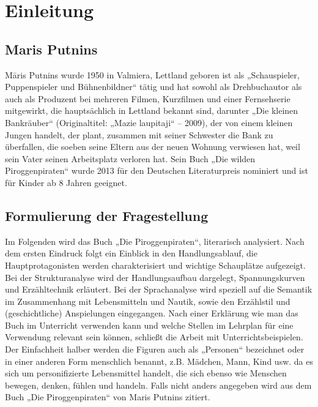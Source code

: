 \chapter{Einleitung}

\section{Maris Putnins}
Māris Putnins wurde 1950 in Valmiera, Lettland geboren ist als „Schauspieler, Puppenspieler und Bühnenbildner“ tätig \cite{pir} und hat sowohl als Drehbuchautor als auch als Produzent bei mehreren Filmen, Kurzfilmen und einer Fernsehserie mitgewirkt, die hauptsächlich in Lettland bekannt  sind, \cite{imdb} darunter „Die kleinen Bankräuber“ (Originaltitel: „Mazie laupitaji“ – 2009), der von einem kleinen Jungen handelt, der plant, zusammen  mit seiner Schwester die Bank zu überfallen, die soeben seine Eltern aus der neuen Wohnung verwiesen hat, weil sein Vater seinen Arbeitsplatz verloren hat. \cite{imdb2}
Sein Buch „Die wilden Piroggenpiraten“ wurde 2013 für den Deutschen Literaturpreis nominiert und ist für Kinder ab 8 Jahren geeignet. 

\section{Formulierung der Fragestellung}
Im Folgenden wird das Buch „Die Piroggenpiraten“, literarisch analysiert. Nach dem ersten Eindruck folgt ein Einblick in den Handlungsablauf, die Hauptprotagonisten werden charakterisiert und wichtige Schauplätze aufgezeigt. Bei der Strukturanalyse wird der Handlungsaufbau dargelegt, Spannungskurven und Erzähltechnik erläutert. Bei der Sprachanalyse wird speziell auf die Semantik im Zusammenhang mit Lebensmitteln und Nautik, sowie den Erzählstil und (geschichtliche) Anspielungen eingegangen. Nach einer Erklärung wie man das Buch im Unterricht verwenden kann und welche Stellen im Lehrplan für eine Verwendung relevant sein können, schließt die Arbeit mit Unterrichtsbeispielen. Der Einfachheit halber werden die Figuren auch als „Personen“ bezeichnet oder in einer anderen Form menschlich benannt, z.B. Mädchen, Mann, Kind usw. da es sich um personifizierte Lebensmittel handelt, die sich ebenso wie Menschen bewegen, denken, fühlen und handeln. Falls nicht anders angegeben wird aus dem Buch „Die Piroggenpiraten“ \cite{pir} von Maris Putnins zitiert.

